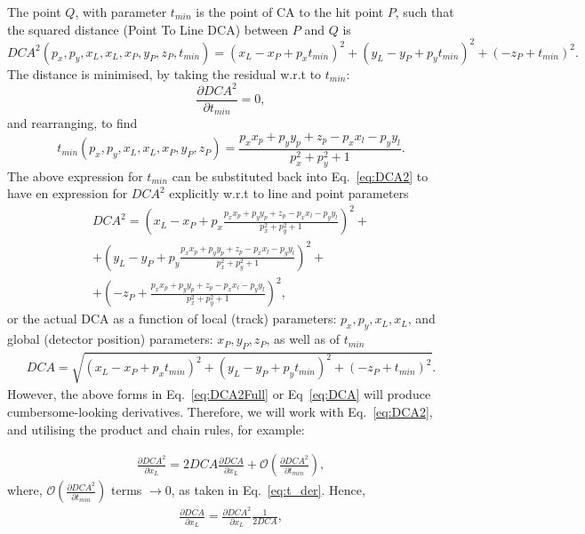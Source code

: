 \documentclass[a4paper,11pt]{article}
\begin{document}
The point $Q$, with parameter $t_{min}$ is the point of CA to the hit point $P$, such that the squared distance (Point To Line DCA) between $P$ and $Q$ is 
\begin{equation}
DCA^2(p_x, p_y, x_L, x_L, x_P, y_P, z_P, t_{min}) = (x_L - x_P + p_xt_{min})^2 + (y_L - y_P + p_yt_{min})^2  + (-z_P + t_{min})^2.
\label{eq:DCA2}
\end{equation}
The distance is minimised, by taking the residual w.r.t to $t_{min}$:
\begin{equation}
\frac{\partial DCA^2}{\partial t_{min}} = 0, 
\label{eq:t_der}
\end{equation}
and rearranging, to find
\begin{equation}
 t_{min}(p_x, p_y, x_L, x_L, x_P, y_P, z_P) = \frac{p_x x_p + p_yy_p +z_p-p_xx_l-p_yy_l}{p^2_x+p^2_y+1}.
 \label{eq:tmin}
\end{equation}
The above expression for $t_{min}$ can be substituted back into Eq.~\ref{eq:DCA2} to have en expression for $DCA^2$ explicitly w.r.t to line and point parameters
\begin{equation}
\begin{split}
DCA^2 = (x_L - x_P + p_x\frac{p_x x_p + p_yy_p +z_p-p_xx_l-p_yy_l}{p^2_x+p^2_y+1})^2 + \\ 
+ (y_L - y_P + p_y\frac{p_x x_p + p_yy_p +z_p-p_xx_l-p_yy_l}{p^2_x+p^2_y+1})^2  + \\
+ (-z_P + \frac{p_x x_p + p_yy_p +z_p-p_xx_l-p_yy_l}{p^2_x+p^2_y+1})^2,
\label{eq:DCA2Full}
\end{split}
\end{equation}
or the actual DCA as a function of local (track) parameters: $ p_x, p_y, x_L, x_L$, and global (detector position) parameters: $x_P, y_P, z_P$, as well as of $t_{min}$
\begin{equation}
\begin{split}
DCA =  \sqrt{ (x_L - x_P + p_xt_{min})^2 + (y_L - y_P + p_yt_{min})^2  + (-z_P + t_{min})^2}.
\label{eq:DCA}
\end{split}
\end{equation}
However, the above forms in Eq.~\ref{eq:DCA2Full} or Eq~\ref{eq:DCA} will produce cumbersome-looking derivatives. Therefore, we will work with Eq.~\ref{eq:DCA2}, and utilising the product and chain rules, for example:

\begin{equation}
\begin{split}
\frac{\partial DCA^2}{\partial x_L} = 2 DCA \frac{\partial DCA}{\partial x_L} + \mathcal{O}(\frac{\partial DCA^2}{\partial t_{min}}),
\end{split}
\end{equation}
where, $\mathcal{O}(\frac{\partial DCA^2}{\partial t_{min}})$ terms $\rightarrow 0$, as taken in Eq.~\ref{eq:t_der}. Hence,
\begin{equation}
\begin{split}
\frac{\partial DCA}{\partial x_L}  = \frac{\partial DCA^2}{\partial x_L} \frac{1}{2 DCA},
\end{split}
\end{equation}
\end{document}
